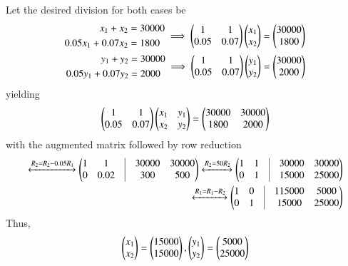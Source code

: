 Let the desired division for both cases be
\begin{align}
\begin{split}
  x_1+x_2 &= 30000\\
  0.05x_1+0.07x_2 &= 1800
\end{split}
\implies 
  \begin{pmatrix}1&1\\0.05&0.07\end{pmatrix}\begin{pmatrix}x_1\\x_2\end{pmatrix} = \begin{pmatrix}30000\\1800\end{pmatrix}
\label{eq:solutions/matrix/292}
\\
\begin{split}
  y_1+y_2 &= 30000\\
  0.05y_1+0.07y_2 &= 2000
\end{split}
\implies  \begin{pmatrix}1&1\\0.05&0.07\end{pmatrix}\begin{pmatrix}y_1\\y_2\end{pmatrix} = \begin{pmatrix}30000\\2000\end{pmatrix}
\label{eq:solutions/matrix/294}
\end{align}
yielding
\begin{align}
  \begin{pmatrix}1&1\\0.05&0.07\end{pmatrix}\begin{pmatrix}x_1&y_1\\x_2&y_2\end{pmatrix} = \begin{pmatrix}30000&30000\\1800&2000\end{pmatrix} 
\end{align}
with the augmented matrix followed by row reduction 
\begin{align}
	\xleftrightarrow{R_2 = R_2 - 0.05 R_1}\myvec{1&1 &\vrule &  30000&30000\\ 0&0.02 & \vrule& 300&500}   
	\xleftrightarrow{R_2 = 50R_2}\myvec{1&1&\vrule& 30000&30000 \\ 0&1 & \vrule &15000&25000} \nonumber \\
	\xleftrightarrow{R_1 = R_1-R_2}\myvec{1&0 & \vrule &115000&5000\\ 0&1& \vrule &15000&25000}\nonumber
\end{align}
Thus, 
\begin{align}
\begin{pmatrix}x_1\\ x_2\end{pmatrix} = \begin{pmatrix}15000 \\ 15000\end{pmatrix},  \begin{pmatrix}y_1\\ y_2\end{pmatrix} = \begin{pmatrix}5000 \\ 25000\end{pmatrix} 
\end{align}
